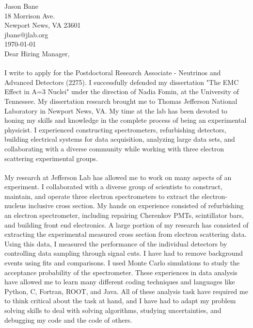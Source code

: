 \documentclass[12pt,letterpaper]{article}
\newcommand{\CPP}
{C\nolinebreak[4]\hspace{-.05em}\raisebox{.22ex}{\footnotesize\bf ++}}
\begin{document}
\vspace*{-1.2cm}
\noindent Jason Bane\\
18 Morrison Ave. \\
Newport News, VA 23601 \\
jbane@jlab.org \\
\today\\

Dear Hiring Manager,

\paragraph{}I write to apply for the Postdoctoral Research Associate - Neutrinos and Advanced Detectors (2275). I successfully defended my dissertation "The EMC Effect in A=3 Nuclei" under the direction of Nadia Fomin, at the University of Tennessee. My dissertation research brought me to Thomas Jefferson National Laboratory in Newport News, VA. My time at the lab has been devoted to honing my skills and knowledge in the complete process of being an experimental physicist. I experienced constructing spectrometers, refurbishing detectors, building electrical systems for data acquisition, analyzing large data sets, and collaborating with a diverse community while working with three electron scattering experimental groups.
\paragraph{}My research at Jefferson Lab has allowed me to work on many aspects of an experiment. I collaborated with a diverse group of scientists to construct, maintain, and operate three electron spectrometers to extract the electron-nucleus inclusive cross section. 
My hands on experience consisted of refurbishing an electron spectrometer, including repairing Cherenkov PMTs, scintillator bars, and building front end electronics. A large portion of my research has consisted of extracting the experimental measured cross section from electron scattering data. Using this data, I measured the performance of the individual detectors by controlling data sampling through signal cuts. I have had to remove background events using fits and comparisons. I used Monte Carlo simulations to study the acceptance probability of the spectrometer. These experiences in data analysis have allowed me to learn many different coding techniques and languages like Python, \CPP, Fortran, ROOT, and Java. All of these analysis task have required me to think critical about the task at hand, and I have had to adapt my problem solving skills to deal with solving algorithms, studying uncertainties, and debugging my code and the code of others. 
\end{document}
